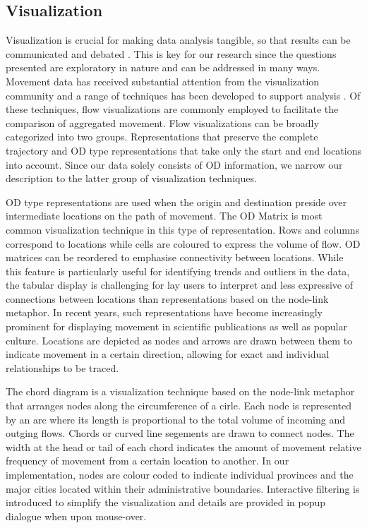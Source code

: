 \documentclass{sig-alternate}
\begin{document}
\subsection{Visualization}

Visualization is crucial for making data analysis tangible, so that results can be communicated and debated \cite{robinson2008collaborative}. 
This is key for our research since the questions presented are exploratory in nature \cite{kraak2008exploratory} and can be addressed in many ways. 
Movement data has received substantial attention from the visualization community and a range of techniques has been developed to support analysis \cite{andrienko2012visual}. 
Of these techniques, flow visualizations are commonly employed to facilitate the comparison of aggregated movement. 
Flow visualizations can be broadly categorized into two groups. Representations that preserve the complete trajectory and OD type representations that take only the start and end locations into account.
Since our data solely consists of OD information, we narrow our description to the latter group of visualization techniques.

OD type representations are used when the origin and destination preside over intermediate locations on the path of movement. 
The OD Matrix is most common visualization technique in this type of representation. 
Rows and columns correspond to locations while cells are coloured to express the volume of flow.
OD matrices can be reordered to emphasise connectivity between locations.
While this feature is particularly useful for identifying trends and outliers in the data, the tabular display is challenging for lay users to interpret and less expressive of connections between locations than representations based on the node-link metaphor.
In recent years, such representations have become increasingly prominent for  displaying movement in scientific publications as well as popular culture.
Locations are depicted as nodes and arrows are drawn between them to indicate movement in a certain direction, allowing for exact and individual relationships to be traced.

The chord diagram is a visualization technique based on the node-link metaphor that arranges nodes along the circumference of a cirle. 
Each node is represented by an arc where its length is proportional to the total volume of incoming and outging flows. 
Chords or curved line segements are drawn to connect nodes. 
The width at the head or tail of each chord indicates the amount of movement relative frequency of movement from a certain location to another. 
In our implementation, nodes are colour coded to indicate individual provinces and the major cities located within their administrative boundaries. 
Interactive filtering is introduced to simplify the visualization and details are provided in popup dialogue when upon mouse-over.
\end{document}
